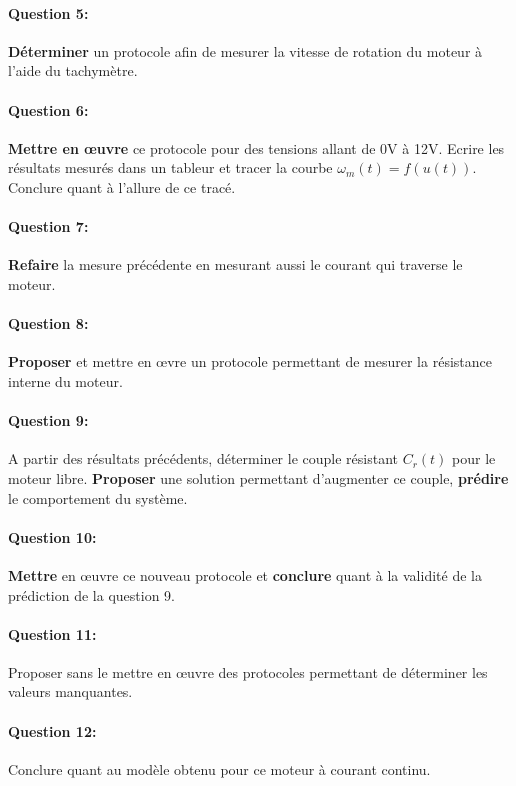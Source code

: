 \paragraph{Question 5:} \textbf{Déterminer} un protocole afin de mesurer la vitesse de rotation du moteur à l'aide du tachymètre.

\paragraph{Question 6:} \textbf{Mettre en \oe uvre} ce protocole pour des tensions allant de 0V à 12V. Ecrire les résultats mesurés dans un tableur et tracer la courbe $\omega_m(t)=f(u(t))$. Conclure quant à l'allure de ce tracé.

\paragraph{Question 7:} \textbf{Refaire} la mesure précédente en mesurant aussi le courant qui traverse le moteur.

\paragraph{Question 8:} \textbf{Proposer} et mettre en \oe vre un protocole permettant de mesurer la résistance interne du moteur.



\paragraph{Question 9:} A partir des résultats précédents, déterminer le couple résistant $C_r(t)$ pour le moteur libre. \textbf{Proposer} une solution permettant d'augmenter ce couple, \textbf{prédire} le comportement du système.


\paragraph{Question 10:} \textbf{Mettre} en \oe uvre ce nouveau protocole et \textbf{conclure} quant à la validité de la prédiction de la question 9.

\newpage


\paragraph{Question 11:} Proposer sans le mettre en \oe uvre des protocoles permettant de déterminer les valeurs manquantes.

\paragraph{Question 12:} Conclure quant au modèle obtenu pour ce moteur à courant continu.

